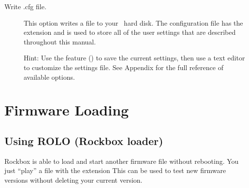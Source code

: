 \begin{description}
			\item [Write .cfg file.]This option writes a  file to 
			your \daps\ hard	disk.  The configuration file has the  
			extension and is used to store all of the user settings that are described 
			throughout this manual.
    
			Hint: Use the  feature () to save the current settings, then 
			use a text editor to customize the settings file. See Appendix 
			 for the full reference of available 
			options.

	\end{description}

\section{\label{ref:FirmwareLoading}Firmware Loading}

\subsection{\label{ref:using_rolo}Using ROLO (Rockbox loader)}
Rockbox is able to load and start another firmware file without rebooting. 
You just ``play'' a file with the extension %
This can be used to test new firmware versions without deleting your
current version.

